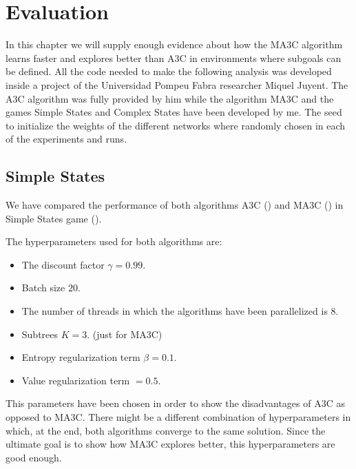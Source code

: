 \chapter{Evaluation}

In this chapter we will supply enough evidence about how the \ac{MA3C} algorithm learns faster and explores better than
\ac{A3C} in environments where subgoals can be defined.
All the code needed to make the following analysis was developed inside a project of the Universidad Pompeu Fabra researcher
Miquel Juyent.
The \ac{A3C} algorithm was fully provided by him while the algorithm \ac{MA3C} and the games Simple States and Complex
States have been developed by me.
The seed to initialize the weights of the different networks where randomly chosen in each of the experiments and runs.

\section{Simple States}

We have compared the performance of both algorithms \ac{A3C} () and \ac{MA3C} () in Simple
States game ().

The hyperparameters used for both algorithms are:
\begin{itemize} %
    \item The discount factor $\gamma = 0.99$.
    \item Batch size $20$. %
    \item The number of threads in which the algorithms have been parallelized is $8$.
    \item Subtrees $K = 3$. (just for \ac{MA3C})
    \item Entropy regularization term $\beta = 0.1$.
    \item Value regularization term $ = 0.5$. %
\end{itemize}

This parameters have been chosen in order to show the disadvantages of \ac{A3C} as opposed to \ac{MA3C}.
There might be a different combination of hyperparameters in which, at the end, both algorithms converge to the same solution.
Since the ultimate goal is to show how \ac{MA3C} explores better, this hyperparameters are good enough.

